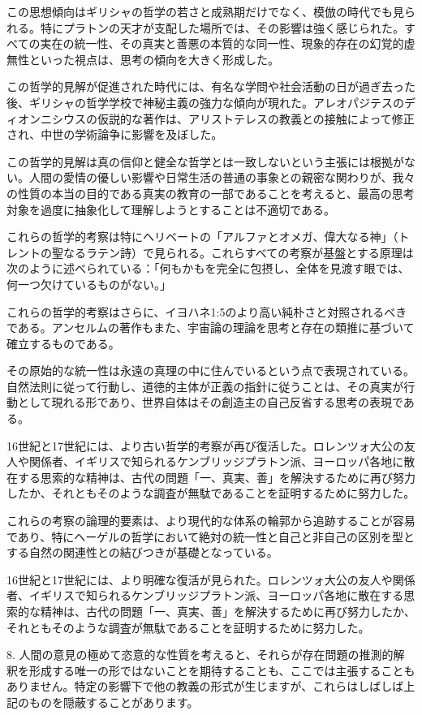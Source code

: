 \documentclass[a4paper,11pt,openany]{ltjsbook}
\begin{document}
この思想傾向はギリシャの哲学の若さと成熟期だけでなく、模倣の時代でも見られる。特にプラトンの天才が支配した場所では、その影響は強く感じられた。すべての実在の統一性、その真実と善悪の本質的な同一性、現象的存在の幻覚的虚無性といった視点は、思考の傾向を大きく形成した。

この哲学的見解が促進された時代には、有名な学問や社会活動の日が過ぎ去った後、ギリシャの哲学学校で神秘主義の強力な傾向が現れた。アレオパジテスのディオンニシウスの仮説的な著作は、アリストテレスの教義との接触によって修正され、中世の学術論争に影響を及ぼした。

この哲学的見解は真の信仰と健全な哲学とは一致しないという主張には根拠がない。人間の愛情の優しい影響や日常生活の普通の事象との親密な関わりが、我々の性質の本当の目的である真実の教育の一部であることを考えると、最高の思考対象を過度に抽象化して理解しようとすることは不適切である。

これらの哲学的考察は特にヘリベートの「アルファとオメガ、偉大なる神」（トレントの聖なるラテン詩）で見られる。これらすべての考察が基盤とする原理は次のように述べられている：「何もかもを完全に包摂し、全体を見渡す眼では、何一つ欠けているものがない。」

これらの哲学的考察はさらに、イヨハネ1:5のより高い純朴さと対照されるべきである。アンセルムの著作もまた、宇宙論の理論を思考と存在の類推に基づいて確立するものである。

その原始的な統一性は永遠の真理の中に住んでいるという点で表現されている。自然法則に従って行動し、道徳的主体が正義の指針に従うことは、その真実が行動として現れる形であり、世界自体はその創造主の自己反省する思考の表現である。

16世紀と17世紀には、より古い哲学的考察が再び復活した。ロレンツォ大公の友人や関係者、イギリスで知られるケンブリッジプラトン派、ヨーロッパ各地に散在する思索的な精神は、古代の問題「一、真実、善」を解決するために再び努力したか、それともそのような調査が無駄であることを証明するために努力した。

これらの考察の論理的要素は、より現代的な体系の輪郭から追跡することが容易であり、特にヘーゲルの哲学において絶対の統一性と自己と非自己の区別を型とする自然の関連性との結びつきが基礎となっている。

16世紀と17世紀には、より明確な復活が見られた。ロレンツォ大公の友人や関係者、イギリスで知られるケンブリッジプラトン派、ヨーロッパ各地に散在する思索的な精神は、古代の問題「一、真実、善」を解決するために再び努力したか、それともそのような調査が無駄であることを証明するために努力した。


8. 人間の意見の極めて恣意的な性質を考えると、それらが存在問題の推測的解釈を形成する唯一の形ではないことを期待することも、ここでは主張することもありません。特定の影響下で他の教義の形式が生じますが、これらはしばしば上記のものを隠蔽することがあります。
\end{document}
